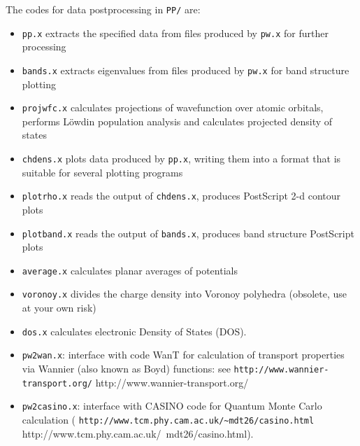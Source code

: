 \documentclass[12pt,a4paper]{article}
\begin{document}
The codes for data postprocessing in \texttt{PP/} are:
\begin{itemize}
  \item \texttt{pp.x} extracts the specified data from files
        produced by \texttt{pw.x} for further processing
  \item \texttt{bands.x} extracts eigenvalues from files produced
        by \texttt{pw.x} for band structure plotting
  \item \texttt{projwfc.x} calculates projections of wavefunction
        over atomic orbitals, performs L\"owdin population
        analysis and calculates projected density of states
  \item \texttt{chdens.x} plots data produced by \texttt{pp.x},
        writing them into a format that is suitable for several
        plotting programs
  \item \texttt{plotrho.x} reads the output of \texttt{chdens.x},
        produces PostScript 2-d contour plots
  \item \texttt{plotband.x} reads the output of \texttt{bands.x},
        produces band structure PostScript plots
  \item \texttt{average.x} calculates planar averages of
        potentials
  \item \texttt{voronoy.x} divides the charge density into Voronoy
        polyhedra (obsolete, use at your own risk)
  \item \texttt{dos.x} calculates electronic Density of States
        (DOS).
  \item \texttt{pw2wan.x}: interface with code WanT for calculation of
        transport properties via Wannier (also known as Boyd)
        functions: see\hfill\break
        \htmladdnormallink%
        {\texttt{http://www.wannier-transport.org/}}%
        {http://www.wannier-transport.org/}
  \item \texttt{pw2casino.x}: interface with CASINO code for Quantum
        Monte Carlo calculation
        (\htmladdnormallink%
         {\texttt{http://www.tcm.phy.cam.ac.uk/\~{}mdt26/casino.html}}%
         {http://www.tcm.phy.cam.ac.uk/~mdt26/casino.html}).
\end{itemize}
\end{document}
